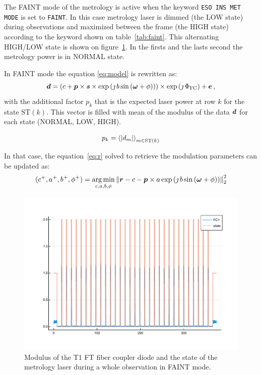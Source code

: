 \documentclass[a4paper,11pt,twoside]{scrartcl}
\begin{document}
The FAINT mode of the metrology is active when the keyword \verb|ESO INS MET MODE| is set to \verb|FAINT|. In this case metrology laser is dimmed (the LOW state) during observations and maximized between the frame (the HIGH state) according to the keyword shown on table~\ref{tab:faint}.  This alternating HIGH/LOW state is shown on figure~\ref{fig:faint}. In the firsts and the lasts second the metrology power is in NORMAL state.

In FAINT mode the equation \ref{eq:model} is rewritten as:
\begin{equation}
    \boldsymbol{d} = \left( c + \boldsymbol{p} \times  \boldsymbol{s} \times  \exp\left( \jmath \, b \sin\left( \boldsymbol{\omega} + \phi\right)\right)\right)\times\exp\left(\jmath\,\Phi_\textrm{FC}\right)+  \boldsymbol{e}\,,\label{eq:modelfaint}
\end{equation}
with the additional factor $p_k$ that is the expected laser power at row $k$ for the state $\textrm{ST}(k)$. This vector is filled with   mean of the modulus of the data $\boldsymbol{d}$  for each state (NORMAL, LOW, HIGH).

\begin{equation}
    p_k = \left\langle \left\vert d_m\right\vert\right\rangle_{m\in \textrm{ST}(k)}
\end{equation}

In that case, the equation~\ref{eq:r} solved to retrieve the modulation parameters can be updated   as:
\begin{equation}
    (c^+, a^+, b^+, \phi^+) = \argmin_{c,a,b,\phi} \Norm{\V{r} -  c - \V{p} \times a \exp\left( \jmath \, b \sin\left( \V{\omega} + \phi\right)\right) }_2^2\label{eq:rfaint}
\end{equation}



\begin{figure}
    \centering
    \includegraphics[width=0.8\linewidth]{figs/FaintStates.pdf}
    \caption{Modulus of the T1 FT fiber coupler diode and the state of the metrology laser during a whole observation in FAINT mode.}
    \label{fig:faint}
\end{figure}
\end{document}
